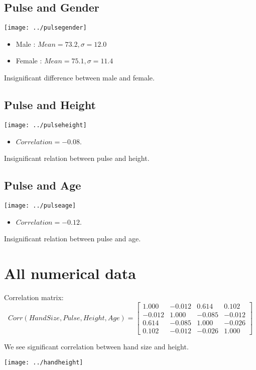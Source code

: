 \documentclass[a4paper,11pt]{article}
\begin{document}
\subsection{Pulse and Gender}
\begin{center}
  \texttt{[image: ../pulsegender]}
\end{center}

\begin{itemize}
  \item Male : $Mean = 73.2, \sigma = 12.0$
  \item Female : $Mean = 75.1, \sigma = 11.4$
\end{itemize}
Insignificant difference between male and female.

\subsection{Pulse and Height}
\begin{center}
  \texttt{[image: ../pulseheight]}
\end{center}

\begin{itemize}
  \item $Correlation = -0.08$.
\end{itemize}
Insignificant relation between pulse and height.

\subsection{Pulse and Age}
\begin{center}
  \texttt{[image: ../pulseage]}
\end{center}

\begin{itemize}
  \item $Correlation = -0.12$.
\end{itemize}
Insignificant relation between pulse and age.

\section{All numerical data}
Correlation matrix:
\[
  Corr(HandSize, Pulse, Height, Age) = \begin{bmatrix}
    1.000 & -0.012 & \mathbf{0.614} & 0.102 \\
    -0.012 & 1.000 & -0.085 & -0.012 \\
    \mathbf{0.614} & -0.085 & 1.000 & -0.026 \\
    0.102 & -0.012 & -0.026 & 1.000
  \end{bmatrix}
\]

We see significant correlation between hand size and height.

\begin{center}
  \texttt{[image: ../handheight]}
\end{center}
\end{document}
